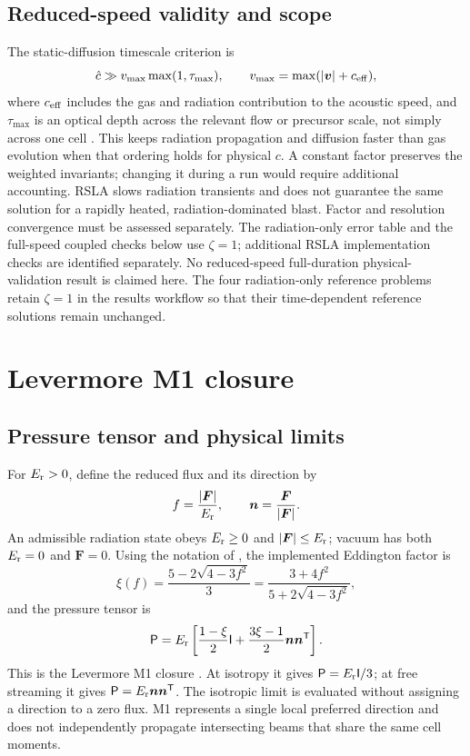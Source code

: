 \documentclass[manuscript]{aastex7}
\newcommand{\vct}[1]{\boldsymbol{#1}}
\newcommand{\Er}{E_{\rm r}}
\newcommand{\Fr}{\vct{F}}
\newcommand{\Prad}{\mathsf{P}}
\newcommand{\Id}{\mathsf{I}}
\newcommand{\chat}{\hat{c}}
\begin{document}
\subsection{Reduced-speed validity and scope}
The static-diffusion timescale criterion is
\begin{equation}
 \chat\gg v_{\max}\max(1,\tau_{\max}),\qquad
 v_{\max}=\max(|\vct{v}|+c_{\rm eff}),
 \label{eq:rsla}
\end{equation}
where $c_{\rm eff}$ includes the gas and radiation contribution to the
acoustic speed, and $\tau_{\max}$ is an optical depth across the relevant
flow or precursor scale, not simply across one cell
\citep[Section~3.2]{SkinnerOstriker2013}. This keeps radiation propagation
and diffusion faster than gas evolution when that ordering holds for
physical $c$. A constant factor preserves the weighted invariants; changing
it during a run would require additional accounting.
RSLA slows radiation transients and does not guarantee the same solution
for a rapidly heated, radiation-dominated blast. Factor and resolution
convergence must be assessed separately. The radiation-only error table
and the full-speed coupled checks below use $\zeta=1$; additional RSLA
implementation checks are identified separately. No reduced-speed
full-duration physical-validation result is claimed here.
The four radiation-only reference problems retain
$\zeta=1$ in the results workflow so that their time-dependent reference
solutions remain unchanged.

\section{Levermore M1 closure}
\subsection{Pressure tensor and physical limits}
For $\Er>0$, define the reduced flux and its direction by
\begin{equation}
 f=\frac{|\Fr|}{\Er},\qquad
 \vct{n}=\frac{\Fr}{|\Fr|}.
\end{equation}
An admissible radiation state obeys $\Er\geq0$ and $|\Fr|\leq\Er$;
vacuum has both $\Er=0$ and $\Fr=0$. Using the notation of
\citet{MelonFuksman2021}, the implemented Eddington factor is
\begin{equation}
 \xi(f)=\frac{5-2\sqrt{4-3f^2}}{3}
 =\frac{3+4f^2}{5+2\sqrt{4-3f^2}},
 \label{eq:eddington}
\end{equation}
and the pressure tensor is
\begin{equation}
 \Prad=\Er\left[
 \frac{1-\xi}{2}\Id+
 \frac{3\xi-1}{2}\vct{n}\vct{n}^{\mathsf T}\right].
 \label{eq:closure}
\end{equation}
This is the Levermore M1 closure \citep{Levermore1984}. At isotropy it gives
$\Prad=\Er\Id/3$; at free streaming it gives
$\Prad=\Er\vct{n}\vct{n}^{\mathsf T}$. The isotropic limit is evaluated
without assigning a direction to a zero flux. M1 represents a single local
preferred direction and does not independently propagate intersecting beams
that share the same cell moments.
\end{document}
